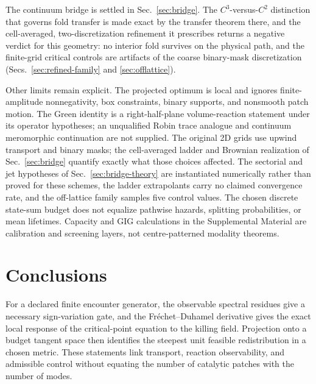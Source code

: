 \documentclass[aps,pre,reprint,amsmath,amssymb,longbibliography,floatfix]{revtex4-2}
\begin{document}
The continuum bridge is settled in Sec.~\ref{sec:bridge}. The
\(C^3\)-versus-\(C^2\) distinction that governs fold transfer is made
exact by the transfer theorem there, and the cell-averaged,
two-discretization refinement it prescribes returns a negative verdict for
this geometry: no interior fold survives on the physical path, and the
finite-grid critical controls are artifacts of the coarse binary-mask
discretization (Secs.~\ref{sec:refined-family} and \ref{sec:offlattice}).

Other limits remain explicit. The projected optimum is local and ignores
finite-amplitude nonnegativity, box constraints, binary supports, and
nonsmooth patch motion. The Green identity is a right-half-plane
volume-reaction statement under its operator hypotheses; an unqualified
Robin trace analogue and continuum meromorphic continuation are not supplied.
The original 2D grids use upwind transport and binary masks; the
cell-averaged ladder and Brownian realization of Sec.~\ref{sec:bridge}
quantify exactly what those choices affected. The sectorial and jet
hypotheses of Sec.~\ref{sec:bridge-theory} are instantiated numerically
rather than proved for these schemes, the ladder extrapolants carry no
claimed convergence rate, and the off-lattice family samples five control
values. The chosen discrete state-sum budget
does not equalize pathwise hazards, splitting probabilities, or mean
lifetimes. Capacity and GIG calculations in the Supplemental Material are
calibration and screening layers, not centre-patterned modality theorems.

\section{Conclusions}
\label{sec:conclusions}

For a declared finite encounter generator, the observable spectral residues
give a necessary sign-variation gate, and the Fr\'echet--Duhamel derivative
gives the exact local response of the critical-point equation to the killing
field. Projection onto a budget tangent space then identifies the steepest
unit feasible redistribution in a chosen metric. These statements link
transport, reaction observability, and admissible control without equating
the number of catalytic patches with the number of modes.
\end{document}
